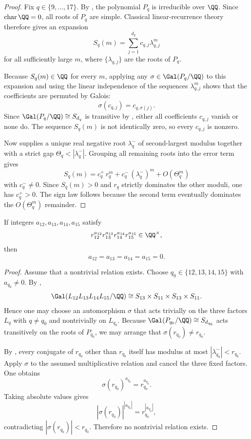 \begin{proof}
Fix \(q\in\{9,\dots,17\}\).  By , the
polynomial \(P_q\) is irreducible over \(\QQ\).  Since \(\operatorname{char}\QQ=0\),
all roots of \(P_q\) are simple.  Classical linear-recurrence theory therefore
gives an expansion
\[
  S_q(m)=\sum_{j=1}^{d_q} c_{q,j}\lambda_{q,j}^m
\]
for all sufficiently large \(m\), where \(\{\lambda_{q,j}\}\) are the roots of
\(P_q\).

Because \(S_q(m)\in\QQ\) for every \(m\), applying any
\(\sigma\in\Gal(P_q/\QQ)\) to this expansion and using the linear independence of
the sequences \(\lambda_{q,j}^m\) shows that the coefficients are permuted by
Galois:
\[
  \sigma(c_{q,j})=c_{q,\sigma(j)}.
\]
Since \(\Gal(P_q/\QQ)\cong S_{d_q}\) is transitive by
, either all coefficients \(c_{q,j}\) vanish or none
do.  The sequence \(S_q(m)\) is not identically zero, so every \(c_{q,j}\) is
nonzero.

Now  supplies a unique real negative root
\(\lambda_q^-\) of second-largest modulus together with a strict gap
\(\Theta_q<|\lambda_q^-|\).  Grouping all remaining roots into the error term
gives
\[
  S_q(m)=c_q^+\,r_q^m+c_q^-\,(\lambda_q^-)^m+O(\Theta_q^m)
\]
with \(c_q^- \neq 0\).  Since \(S_q(m)>0\) and \(r_q\) strictly dominates the
other moduli, one has \(c_q^+>0\).  The sign law follows because the second term
eventually dominates the \(O(\Theta_q^m)\) remainder.
\end{proof}

\begin{theorem}
\label{thm:perron-multiplicative-independence}
If integers \(a_{12},a_{13},a_{14},a_{15}\) satisfy
\[
  r_{12}^{a_{12}}r_{13}^{a_{13}}r_{14}^{a_{14}}r_{15}^{a_{15}}\in\QQ^\times,
\]
then
\[
  a_{12}=a_{13}=a_{14}=a_{15}=0.
\]
\end{theorem}

\begin{proof}
Assume that a nontrivial relation exists.  Choose
\(q_0\in\{12,13,14,15\}\) with \(a_{q_0}\neq 0\).  By
,
\[
  \Gal(L_{12}L_{13}L_{14}L_{15}/\QQ)
  \cong
  S_{13}\times S_{11}\times S_{13}\times S_{11}.
\]
Hence one may choose an automorphism \(\sigma\) that acts trivially on the
three factors \(L_q\) with \(q\neq q_0\) and nontrivially on \(L_{q_0}\).
Because \(\Gal(P_{q_0}/\QQ)\cong S_{d_{q_0}}\) acts transitively on the roots of
\(P_{q_0}\), we may arrange that \(\sigma(r_{q_0})\neq r_{q_0}\).

By , every conjugate of \(r_{q_0}\) other
than \(r_{q_0}\) itself has modulus at most \(|\lambda_{q_0}^-|<r_{q_0}\).
Apply \(\sigma\) to the assumed multiplicative relation and cancel the three
fixed factors.  One obtains
\[
  \sigma(r_{q_0})^{a_{q_0}}=r_{q_0}^{a_{q_0}}.
\]
Taking absolute values gives
\[
  |\sigma(r_{q_0})|^{|a_{q_0}|}=r_{q_0}^{|a_{q_0}|},
\]
contradicting \(|\sigma(r_{q_0})|<r_{q_0}\).  Therefore no nontrivial relation
exists.
\end{proof}

